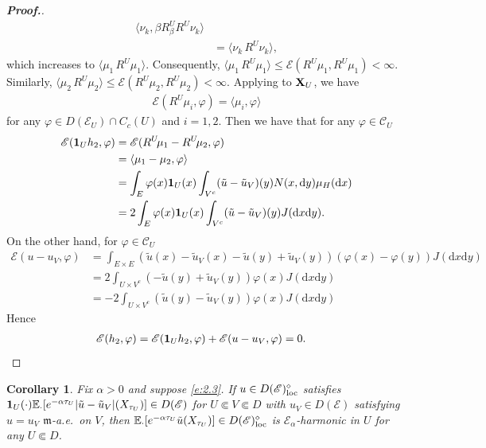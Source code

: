 \documentclass[12pt,a4paper]{article}
\newtheorem{cor}[thm]{Corollary}
\renewcommand{\d}{\mathrm{d}}
\newcommand{\m}{\mathfrak{m} }
\newcommand{\loc}{{\rm loc}}
\newcommand{\1}{{\bf 1}}
\begin{document}
\begin{proof}[{\bf Proof.}]
\begin{align*}
\langle \nu_k,\beta R^U_{\beta}R^U\!\nu_k\rangle\\
&=\langle \nu_k\,R^U\!\nu_k\rangle,
\end{align*}
which increases to $\langle \mu_1\,R^U\!\mu_1\rangle$. 
Consequently, $\langle \mu_1\,R^U\!\mu_1\rangle\leq \mathscr{E}(R^U\!\mu_1,R^U\!\mu_1)<\infty$. Similarly, $\langle \mu_2\,R^U\!\mu_2\rangle\leq \mathscr{E}(R^U\!\mu_2,R^U\!\mu_2)<\infty$.  
Applying \cite[Lemma~2.4]{Chen} to ${\bf X}_U$, we have 
\begin{align*}
\mathscr{E}(R^U\!\mu_i,\varphi)=
\langle \mu_i,\varphi\rangle
\end{align*}
for any $\varphi\in D(\mathscr{E}_U)\cap C_c(U)$ and $i=1,2$. 
Then we have that for any $\varphi\in \mathscr{C}_U$
\begin{align*}
\mathscr{E}(\1_Uh_2,\varphi)&=\mathscr{E}(R^U\!\mu_1-R^U\!\mu_2,\varphi)
\\&=\langle \mu_1-\mu_2,\varphi\rangle
\\&=\int_E\varphi(x)\1_U(x)\int_{V^c}
(\tilde{u}-\tilde{u}_V)(y)N(x,{\d} y)\mu_H({\d} x)\\
&=2\int_E\varphi(x)\1_U(x)\int_{V^c}
(\tilde{u}-\tilde{u}_V)(y)J({\d} x{\d} y).
\end{align*}
On the other hand, for $\varphi\in\mathscr{C}_U$
\begin{align*}
\mathscr{E}(u-u_V,\varphi)&=\int_{E\times E}(\tilde{u}(x)-\tilde{u}_V(x)-\tilde{u}(y)+\tilde{u}_V(y))
(\varphi(x)-\varphi(y))J({\d} x{\d} y)\\
&=2\int_{U\times V^c}(-\tilde{u}(y)+\tilde{u}_V(y))
\varphi(x)J({\d} x{\d} y)\\
&=-2\int_{U\times V^c}(\tilde{u}(y)-\tilde{u}_V(y))\varphi(x)J({\d} x{\d} y)
\end{align*}
Hence
\begin{align*}
\mathscr{E}(h_2,\varphi)&=\mathscr{E}(\1_Uh_2,\varphi)+\mathscr{E}(u-u_V,\varphi)=0.
\end{align*}
\end{proof}
\begin{cor}\label{cor:Subharmonicity}
Fix $\alpha>0$ and suppose \eqref{e:2.3}.
If $u\in  D(\mathscr{E})^{\diamond}_{\loc}$ satisfies 
$\1_U(\cdot)\mathbb{E}_{\cdot}[e^{-\alpha\tau_U}|\tilde{u}-\tilde{u}_V|(X_{\tau_U})]\in D(\mathscr{E})$ for $U\Subset V\Subset D$ with $u_V\in D(\mathscr{E})$ satisfying $u=u_V$ ${\m}$-a.e.~on $V$, then $\mathbb{E}_{\cdot}[e^{-\alpha\tau_U}\tilde{u}(X_{\tau_U})]\in D(\mathscr{E})^{\diamond}_{\loc}$ is $\mathscr{E}_{\alpha}$-harmonic in $U$ for any $U\Subset D$. 
\end{cor}
\end{document}
